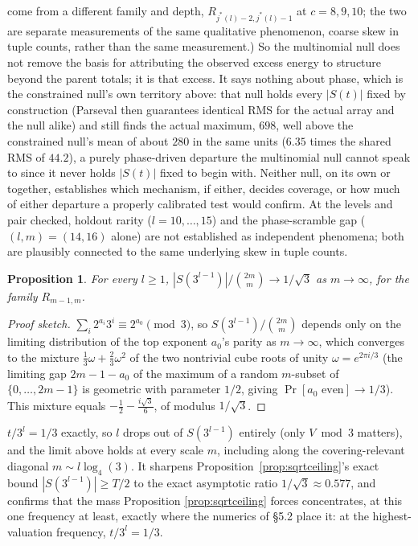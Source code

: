 \documentclass[11pt]{amsart}
\theoremstyle{plain}
\newtheorem{proposition}[theorem]{Proposition}
\theoremstyle{definition}
\theoremstyle{remark}
\begin{document}
come from a different family and depth, $R_{j^*(l)-2,j^*(l)-1}$ at $c=8,9,10$; the two are separate
measurements of the same qualitative phenomenon, coarse skew in tuple counts, rather than the same
measurement.) So the multinomial null does not remove the basis for attributing the
observed excess energy to structure beyond the parent totals; it is that excess. It says nothing
about phase, which is the constrained null's own territory above: that
null holds every $|S(t)|$ fixed by construction (Parseval then guarantees identical RMS for the actual
array and the null alike) and still finds the actual maximum, $698$, well above the constrained null's
mean of about $280$ in the same units ($6.35$ times the shared RMS of $44.2$), a purely phase-driven
departure the multinomial null cannot speak to since it never holds $|S(t)|$ fixed to begin with. Neither
null, on its own or together, establishes which mechanism, if either, decides coverage, or how much of
either departure a properly calibrated test would confirm. At the levels and pair checked, holdout
rarity ($l=10,\dots,15$) and the phase-scramble gap ($(l,m)=(14,16)$ alone) are not established as
independent phenomena; both are plausibly connected to the same underlying skew in tuple counts.

\begin{proposition}
\label{prop:1547}
For every $l\ge1$, $|S(3^{l-1})|/\binom{2m}{m} \to 1/\sqrt3$ as $m\to\infty$, for the family
$R_{m-1,m}$.
\end{proposition}

\begin{proof}[Proof sketch]
$\sum_i 2^{a_i}3^i \equiv 2^{a_0} \pmod 3$, so $S(3^{l-1})/\binom{2m}{m}$ depends only on the
limiting distribution of the top exponent $a_0$'s parity as $m\to\infty$, which converges to the
mixture $\tfrac13\omega + \tfrac23\omega^2$ of the two nontrivial cube roots of unity
$\omega=e^{2\pi i/3}$ (the limiting gap $2m-1-a_0$ of the maximum of a random $m$-subset of
$\{0,\dots,2m-1\}$ is geometric with parameter $1/2$, giving $\Pr[a_0\text{ even}]\to1/3$). This
mixture equals $-\tfrac12 - \tfrac{i\sqrt3}6$, of modulus $1/\sqrt3$.
\end{proof}

$t/3^l=1/3$ exactly, so $l$ drops out of $S(3^{l-1})$ entirely (only $V\bmod3$ matters), and the
limit above holds at every scale $m$, including along the covering-relevant diagonal $m\sim
l\log_4(3)$. It sharpens Proposition~\ref{prop:sqrtceiling}'s exact bound $|S(3^{l-1})|\ge T/2$ to
the exact asymptotic ratio $1/\sqrt3\approx0.577$, and confirms that the mass Proposition
\ref{prop:sqrtceiling} forces concentrates, at this one frequency at least, exactly where the
numerics of \S5.2 place it: at the highest-valuation frequency, $t/3^l=1/3$.
\end{document}
